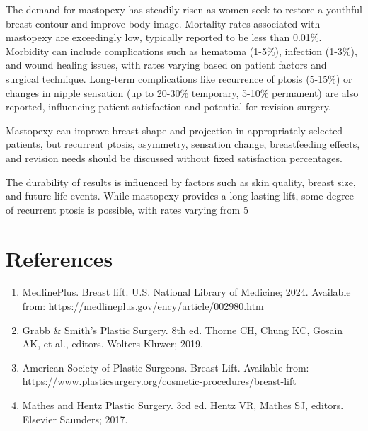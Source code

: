 The demand for mastopexy has steadily risen as women seek to restore a youthful breast contour and improve body image. Mortality rates associated with mastopexy are exceedingly low, typically reported to be less than 0.01\%. Morbidity can include complications such as hematoma (1-5\%), infection (1-3\%), and wound healing issues, with rates varying based on patient factors and surgical technique. Long-term complications like recurrence of ptosis (5-15\%) or changes in nipple sensation (up to 20-30\% temporary, 5-10\% permanent) are also reported, influencing patient satisfaction and potential for revision surgery.

Mastopexy can improve breast shape and projection in appropriately selected patients, but recurrent ptosis, asymmetry, sensation change, breastfeeding effects, and revision needs should be discussed without fixed satisfaction percentages.

The durability of results is influenced by factors such as skin quality, breast size, and future life events. While mastopexy provides a long-lasting lift, some degree of recurrent ptosis is possible, with rates varying from 5%

\section*{References}
\begin{enumerate}
  \item MedlinePlus. Breast lift. U.S. National Library of Medicine; 2024. Available from: \url{https://medlineplus.gov/ency/article/002980.htm}
  
  \item Grabb \& Smith's Plastic Surgery. 8th ed. Thorne CH, Chung KC, Gosain AK, et al., editors. Wolters Kluwer; 2019.
  
  \item American Society of Plastic Surgeons. Breast Lift. Available from: \url{https://www.plasticsurgery.org/cosmetic-procedures/breast-lift}
  
  \item Mathes and Hentz Plastic Surgery. 3rd ed. Hentz VR, Mathes SJ, editors. Elsevier Saunders; 2017.
\end{enumerate}

\clearpage
